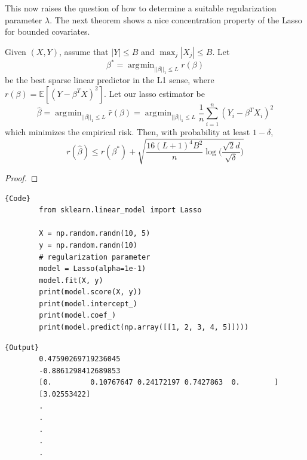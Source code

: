 \documentclass{article}
\DeclareMathOperator*{\argmin}{\arg\!\min}
\begin{document}
    This now raises the question of how to determine a suitable regularization parameter $\lambda$. The next theorem shows a nice concentration property of the Lasso for bounded covariates. 

    \begin{theorem}
      Given $(X, Y)$, assume that $|Y| \leq B$ and $\max_j |X_j| \leq B$. Let 
      \begin{equation}
        \beta^\ast = \argmin_{||\beta||_1 \leq L} r(\beta)
      \end{equation}
      be the best sparse linear predictor in the L1 sense, where $r(\beta) = \mathbb{E}[ (Y - \beta^T X)^2]$. Let our lasso estimator be 
      \begin{equation}
        \hat{\beta} = \argmin_{||\beta||_1 \leq L} \hat{r}(\beta) = \argmin_{||\beta||_1 \leq L} \frac{1}{n} \sum_{i=1}^n (Y_i - \beta^T X_i)^2
      \end{equation}
      which minimizes the empirical risk. Then, with probability at least $1 - \delta$, 
      \begin{equation}
        r(\hat{\beta}) \leq r(\beta^\ast) + \sqrt{\frac{16(L+1)^4 B^2}{n} \log \bigg( \frac{\sqrt{2} d}{\sqrt{\delta}} \bigg)} 
      \end{equation}
    \end{theorem}
    \begin{proof}
      
    \end{proof}

    \begin{code}
      \noindent\begin{minipage}{.6\textwidth}
      \begin{lstlisting}[]{Code}
        from sklearn.linear_model import Lasso

        X = np.random.randn(10, 5) 
        y = np.random.randn(10)
        # regularization parameter
        model = Lasso(alpha=1e-1)  
        model.fit(X, y) 
        print(model.score(X, y))  
        print(model.intercept_)
        print(model.coef_) 
        print(model.predict(np.array([[1, 2, 3, 4, 5]]))) 
      \end{lstlisting}
      \end{minipage}
      \hfill
      \begin{minipage}{.39\textwidth}
      \begin{lstlisting}[]{Output}
        0.47590269719236045
        -0.8861298412689853
        [0.         0.10767647 0.24172197 0.7427863  0.        ]
        [3.02553422]
        .
        .
        .
        .
        .
      \end{lstlisting}
      \end{minipage}
    \end{code}
\end{document}
